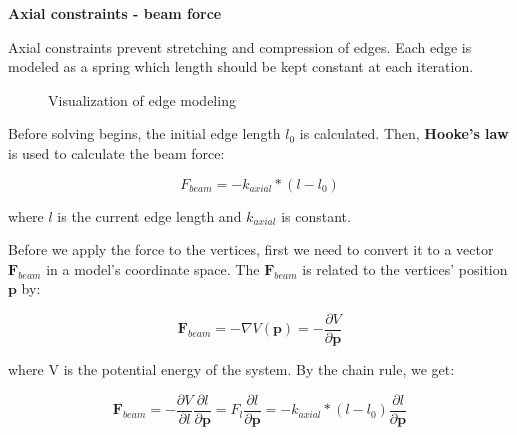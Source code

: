 \smallskip
\textbf{Axial constraints - beam force}
\smallskip

Axial constraints prevent stretching and compression of edges. 
Each edge is modeled as a spring which length should be kept constant at each iteration.

\begin{figure}[H]
	\caption{Visualization of edge modeling}
    \centering
    \qquad
\end{figure}

Before solving begins, the initial edge length $l_{0}$ is calculated.
Then, \textbf{Hooke's law} is used to calculate the beam force:

$$F_{beam} = -k_{axial} * (l - l_{0})$$

where $l$ is the current edge length and $k_{axial}$ is constant.

\smallskip
Before we apply the force to the vertices, first we need to convert it to a vector $\pmb{F}_{beam}$ in a model's coordinate space.
The $\pmb{F}_{beam}$ is related to the vertices' position $\pmb{p}$ by:

$$\pmb{F}_{beam} = -\nabla V(\pmb{p}) = -\frac{\partial V}{\partial \pmb{p}}$$

where V is the potential energy of the system. By the chain rule, we get:

\begin{equation} \label{Solver:beam_force}
\pmb{F}_{beam} = -\frac{\partial V}{\partial l}\frac{\partial l}{\partial \pmb{p}} = F_{l}\frac{\partial l}{\partial \pmb{p}} = -k_{axial} * (l - l_{0})\frac{\partial l}{\partial \pmb{p}}
\end{equation}


